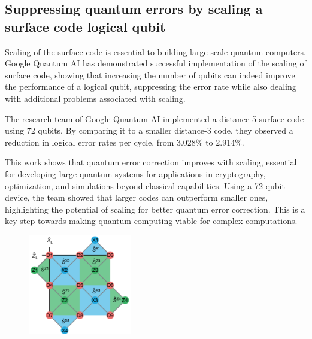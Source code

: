 \subsection{Suppressing quantum errors by scaling a surface code logical qubit}

Scaling of the surface code is essential to building large-scale quantum computers. Google Quantum AI has demonstrated successful implementation of the scaling of surface code, showing that increasing the number of qubits can indeed improve the performance of a logical qubit, suppressing the error rate while also dealing with additional problems associated with scaling.

The research team of Google Quantum AI implemented a distance-5 surface code using 72 qubits. By comparing it to a smaller distance-3 code, they observed a reduction in logical error rates per cycle, from 3.028\% to 2.914\%.

This work shows that quantum error correction improves with scaling, essential for developing large quantum systems for applications in cryptography, optimization, and simulations beyond classical capabilities. Using a 72-qubit device, the team showed that larger codes can outperform smaller ones, highlighting the potential of scaling for better quantum error correction. This is a key step towards making quantum computing viable for complex computations.



\begin{figure}[h]
    \centering
    \includegraphics[width=0.4\textwidth]{sections/5_practical_implementation/representation.png}
    \caption{}
\end{figure}

